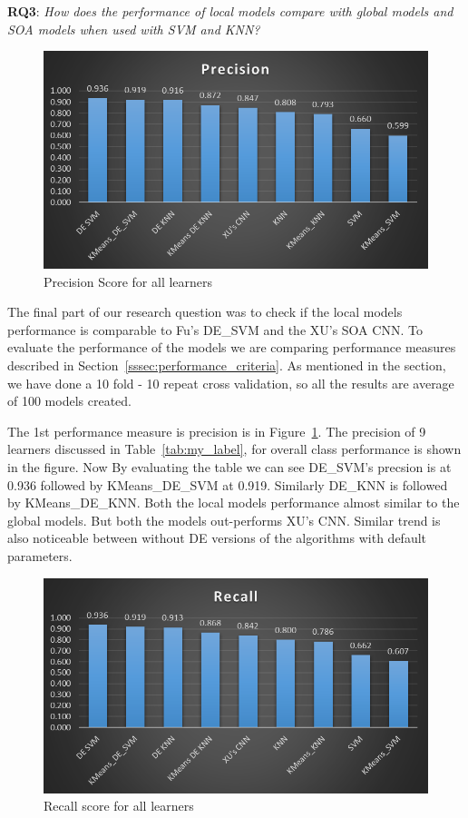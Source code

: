 \documentclass[sigconf]{acmart}
\theoremstyle{break}
\begin{document}
    \textbf{RQ3}: {\em   How does the performance of local models compare with global models and SOA models when used with SVM and KNN?} 
    
    \begin{figure}
        \centering
        \includegraphics[width=\linewidth]{fig/precision.png}
        \caption{Precision Score for all learners}
        \label{fig:precison}
    \end{figure}
    
    The final part of our research question was to check if the local models performance is comparable to Fu's DE\_SVM and the XU's SOA CNN. To evaluate the performance of the models we are comparing performance measures described in Section~\ref{sssec:performance_criteria}. As mentioned in the section, we have done a 10 fold - 10 repeat cross validation, so all the results are average of 100 models created. 
    
    The 1st performance measure is precision is in Figure~\ref{fig:precison}. The precision of 9 learners discussed in Table~\ref{tab:my_label}, for overall class performance is shown in the figure. Now By evaluating the table we can see DE\_SVM's precsion is at 0.936 followed by KMeans\_DE\_SVM at 0.919. Similarly DE\_KNN is followed by KMeans\_DE\_KNN. Both the local models performance almost similar to the global models. But both the models out-performs XU's CNN. Similar trend is also noticeable between without DE versions of the algorithms with default parameters.
    
     \begin{figure}
        \centering
        \includegraphics[width=\linewidth]{fig/recall.png}
        \caption{Recall score for all learners}
        \label{fig:Recall}
    \end{figure}
    
\end{document}
